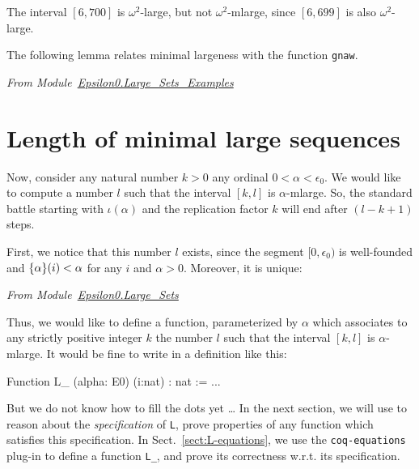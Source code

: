 

The interval $[6,700]$ is $\omega^2$-large, but not
$\omega^2$-mlarge, since $[6,699]$ is also $\omega^2$-large.




The following lemma relates minimal largeness with the
function 
\texttt{gnaw}. 



\vspace{4pt}
 \noindent
\emph{From Module~\href{../theories/html/hydras.Epsilon0.Large_Sets_Examples.html}{Epsilon0.Large\_Sets\_Examples}}



\section{Length of minimal large sequences}

Now, consider any natural number $k>0$ any ordinal $0<\alpha<\epsilon_0$.  We would like to compute
a number $l$ such that the interval $[k,l]$ is $\alpha$-mlarge. So, 
the standard battle starting with $\iota(\alpha)$ and the replication factor $k$ will end after $(l-k+1)$ steps.



First, we notice that this  number $l$ exists, since the segment $[0,\epsilon_0)$ is well-founded and $\mbox{$\{\alpha\}(i)$}<\alpha$ for any $i$ and $\alpha>0$.
Moreover, it is unique:

\vspace{4pt}
\noindent
\emph{From Module~\href{../theories/html/hydras.Epsilon0.Large_Sets.html}{Epsilon0.Large\_Sets}}




Thus, we would like to define a function, parameterized by $\alpha$ which associates to any  strictly positive integer $k$ the number $l$ such that
the interval $[k,l]$ is $\alpha$-mlarge. It would be fine to write in \gallina{} a definition like this:

\begin{Coqbad}
Function L_ (alpha: E0) (i:nat) :  nat := ...
\end{Coqbad}

But we do not know how to fill the dots yet \dots{}   In the next section, we will 
use \coq{} to reason  about the \emph{specification} of \texttt{L},
prove properties of any function which satisfies this specification.
In Sect.~\ref{sect:L-equations}, we use the \texttt{coq-equations} plug-in
to define a function \texttt{L\_}, and prove its correctness w.r.t. its specification.


